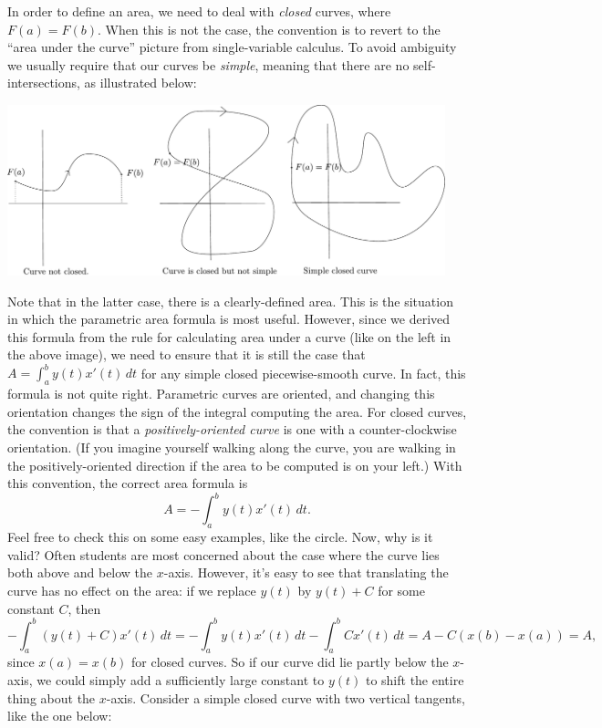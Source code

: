 \documentclass[letterpaper,12pt]{article}
\newcommand{\di}{\displaystyle}
\begin{document}
In order to define an area, we need to deal with {\em closed} curves, where $F(a)=F(b)$. When this is not the case, the convention is to revert to the ``area under the curve'' picture from single-variable calculus. To avoid ambiguity we usually require that our curves be {\em simple}, meaning that there are no self-intersections, as illustrated below:
\begin{center}
 \includegraphics[width=5in]{Curves.pdf}
\end{center}
Note that in the latter case, there is a clearly-defined area. This is the situation in which the parametric area formula is most useful. However, since we derived this formula from the rule for calculating area under a curve (like on the left in the above image), we need to ensure that it is still the case that $\di A = \int_a^b y(t)x'(t)\,dt$ for any simple closed piecewise-smooth curve.
In fact, this formula is not quite right. Parametric curves are oriented, and changing this orientation changes the sign of the integral computing the area. For closed curves, the convention is that a {\em positively-oriented curve} is one with a counter-clockwise orientation. (If you imagine yourself walking along the curve, you are walking in the positively-oriented direction if the area to be computed is on your left.) With this convention, the correct area formula is
\[
 A = -\int_a^b y(t)x'(t)\,dt.
\]
 Feel free to check this on some easy examples, like the circle. Now, why is it valid? Often students are most concerned about the case where the curve lies both above and below the $x$-axis. However, it's easy to see that translating the curve has no effect on the area: if we replace $y(t)$ by $y(t)+C$ for some constant $C$, then
\[
 -\int_a^b (y(t)+C)x'(t)\,dt = -\int_a^by(t)x'(t)\,dt -\int_a^b Cx'(t)\,dt = A -C(x(b)-x(a)) = A,
\]
since $x(a)=x(b)$ for closed curves. So if our curve did lie partly below the $x$-axis, we could simply add a sufficiently large constant to $y(t)$ to shift the entire thing about the $x$-axis. Consider a simple closed curve with two vertical tangents, like the one below:
\end{document}
